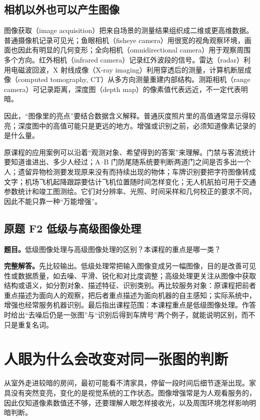 \subsection{相机以外也可以产生图像}

图像获取（image acquisition）把来自场景的测量结果组织成二维或更高维数据。普通摄像机记录可见光；鱼眼相机（fisheye camera）用很宽的视角观察环境，画面也因此有明显的几何变形；全向相机（omnidirectional camera）用于观察周围多个方向。红外相机（infrared camera）记录红外波段的信号。雷达（radar）利用电磁波回波，X 射线成像（X-ray imaging）利用穿透后的测量，计算机断层成像（computed tomography, CT）从多方向测量重建内部结构。测距相机（range camera）可记录距离，深度图（depth map）的像素值代表远近，不一定代表明暗。

因此，“图像里的亮点”要结合数据含义解释。普通灰度照片里的高值通常显示得较亮；深度图中的高值可能只是更远的地方。增强或识别之前，必须知道像素记录的是什么量。

原课程的应用案例可以沿着“观测对象、希望得到的答案”来理解。门禁与客流统计要知道谁进出、多少人经过；A--B 门防尾随系统要判断两道门之间是否多出一个人；遗留异物检测要发现原来没有而持续出现的物体；车牌识别要把字符图像转成文字；机场飞机起降跟踪要估计飞机位置随时间怎样变化；无人机航拍可用于交通参数统计和竣工图测绘。它们对分辨率、光照、时间采样和几何校正的要求不同，因此不能只靠一种“万能增强”。

\subsection*{原题 F2 低级与高级图像处理}
\label{original:F2}
\textbf{题目。}低级图像处理与高级图像处理的区别？本课程的重点是哪一类？

\textbf{完整解答。}先比较输出。低级处理常把输入图像变成另一幅图像，目的是改善可见性或数据质量，如去噪、平滑、锐化和对比度调整；高级处理更关注从图像中获取结构或语义，如分割对象、描述特征、识别类别。再比较服务对象：原课程把前者重点描述为面向人的观察，把后者重点描述为面向机器的自主感知；实际系统中，增强也经常服务机器识别。最后指出课程范围：本课程重点是低级图像处理。作答时给出“去噪后仍是一张图”与“识别后得到车牌号”两个例子，就能说明区别，而不只是重复名词。

\section{人眼为什么会改变对同一张图的判断}
\label{sec:foundations-eye}

从室外走进较暗的房间，最初可能看不清家具，停留一段时间后细节逐渐出现。家具没有突然变亮，变化的是视觉系统的工作状态。图像增强常是为人观看服务的，因此仅知道像素数值还不够，还要理解人眼怎样接收光，以及周围环境怎样影响明暗判断。

